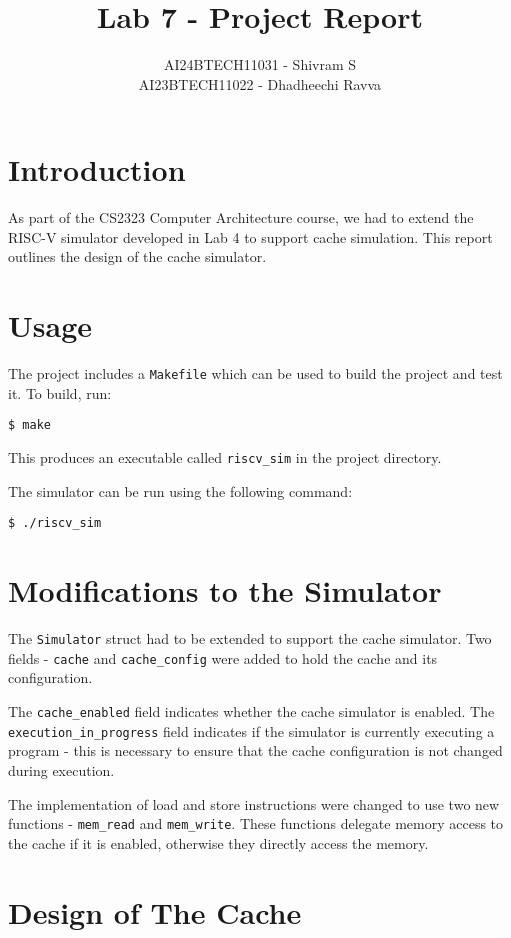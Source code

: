 \documentclass{article}
\title{Lab 7 - Project Report}
\author{AI24BTECH11031 - Shivram S\\
AI23BTECH11022 - Dhadheechi Ravva}
\date{}
\begin{document}
\maketitle
\tableofcontents
\pagebreak

\section{Introduction}

As part of the CS2323 Computer Architecture course, we had to extend the RISC-V 
simulator developed in Lab 4 to support cache simulation. This report outlines
the design of the cache simulator.

\section{Usage}

The project includes a \texttt{Makefile} which can be used to build the project and
test it. To build, run:
\begin{verbatim}
$ make
\end{verbatim} 
This produces an executable called \texttt{riscv\_sim} in the project directory.

The simulator can be run using the following command:
\begin{verbatim}
$ ./riscv_sim
\end{verbatim}

\section{Modifications to the Simulator}

The \texttt{Simulator} struct had to be extended to support the cache 
simulator. Two fields - \texttt{cache} and \texttt{cache\_config}
were added to hold the cache and its configuration.

The \texttt{cache\_enabled} field indicates whether the cache simulator
is enabled. The \texttt{execution\_in\_progress} field indicates if the simulator is
currently executing a program - this is necessary to ensure that the
cache configuration is not changed during execution.

The implementation of load and store instructions were changed to use
two new functions - \texttt{mem\_read} and \texttt{mem\_write}. These
functions delegate memory access to the cache if it is enabled, otherwise
they directly access the memory.

\section{Design of The Cache}
\end{document}
